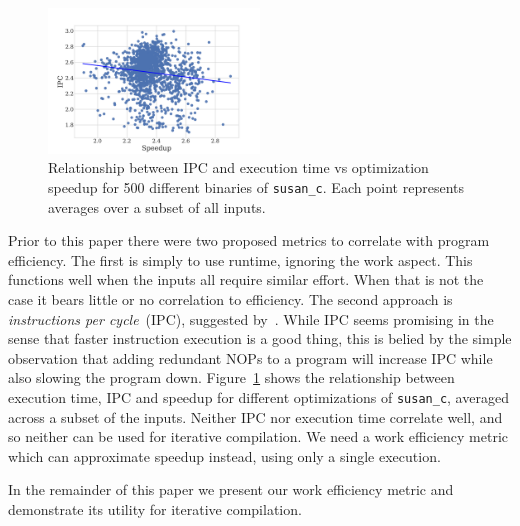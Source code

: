     \begin{figure}[t]
        \centering
        \includegraphics[width=0.5\textwidth]{figs/motivation-metric.pdf}
        \caption{
            Relationship between IPC and execution time vs optimization speedup for 500 different binaries of \texttt{susan\_c}.
            Each point represents averages over a subset of all inputs.
        }
        \label{fig:motivation-metric}
    \end{figure}
    
    Prior to this paper there were two proposed metrics to correlate with program efficiency. The first is simply to use runtime, ignoring
    the work aspect. This functions well when the inputs all require similar effort. When that is not the case it bears little or no
    correlation to efficiency. The second approach is \textit{instructions per cycle}~(IPC), suggested by~\citep{fursin07}. While IPC seems
    promising in the sense that faster instruction execution is a good thing, this is belied by the simple observation that adding
    redundant NOPs to a program will increase IPC while also slowing the program down. Figure~\ref{fig:motivation-metric} shows the
    relationship between execution time, IPC and speedup for different optimizations of \texttt{susan\_c}, averaged across a subset of the
    inputs. Neither IPC nor execution time correlate well, and so neither can be used for iterative compilation. We need a work efficiency
    metric which can approximate speedup instead, using only a single execution.

    In the remainder of this paper we present our work efficiency metric and demonstrate its utility for iterative compilation.
